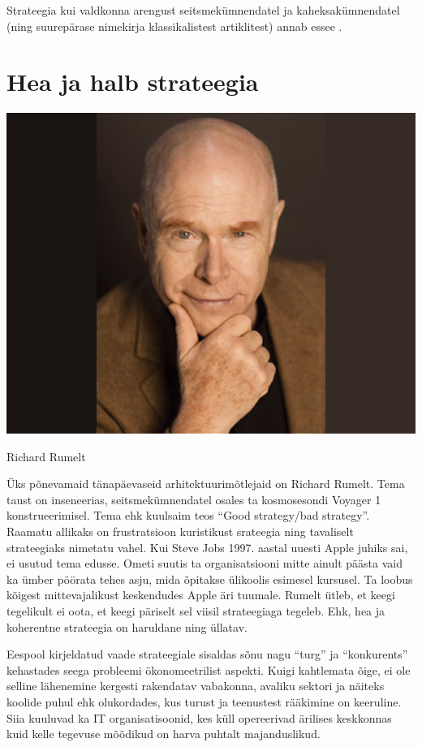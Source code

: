 Strateegia kui valdkonna arengust seitsmekümnendatel ja kaheksakümnendatel (ning suurepärase nimekirja klassikalistest artiklitest) annab \citeauthor{rumelt1991strategic} essee\cite{rumelt1991strategic} .

\section{Hea ja halb strateegia}
\label{sec:strategy:goodbad}

\begin{marginfigure}
	\begin{center}
		\includegraphics[trim={5cm 0 5cm 0},clip,width=.7\linewidth]{richard_rumelt.jpg}
		\caption{Richard Rumelt}
		\label{fig:rumelt}
	\end{center}
\end{marginfigure}

Üks põnevamaid tänapäevaseid arhitektuurimõtlejaid on Richard Rumelt. Tema taust on inseneerias, seitsmekümnendatel osales ta kosmosesondi Voyager 1 konstrueerimisel. Tema ehk kuulsaim teos \enquote{Good strategy/bad strategy}\cite{rumelt2011good}. Raamatu allikaks on frustratsioon kuristikust srateegia ning tavaliselt strateegiaks nimetatu vahel. Kui Steve Jobs 1997. aastal uuesti Apple juhiks sai, ei usutud tema edusse. Ometi suutis ta organisatsiooni mitte ainult päästa vaid ka ümber pöörata tehes asju, mida õpitakse ülikoolis esimesel kursusel. Ta loobus kõigest mittevajalikust keskendudes Apple äri tuumale. Rumelt ütleb, et keegi tegelikult ei oota, et keegi päriselt sel viisil strateegiaga tegeleb. Ehk, hea ja koherentne strateegia on haruldane ning üllatav.

Eespool kirjeldatud vaade strateegiale sisaldas sõnu nagu \enquote{turg} ja \enquote{konkurents} kehastades seega probleemi ökonomeetrilist aspekti. Kuigi kahtlemata õige, ei ole selline lähenemine kergesti rakendatav vabakonna, avaliku sektori ja näiteks koolide puhul ehk olukordades, kus turust ja teenustest rääkimine on keeruline. Siia kuuluvad ka IT organisatisoonid, kes küll opereerivad ärilises keskkonnas kuid kelle tegevuse mõõdikud on harva puhtalt majanduslikud.

